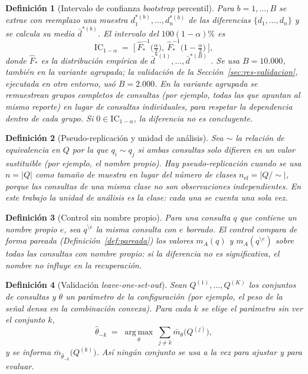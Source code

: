 \documentclass[11pt,letterpaper]{article}
\newtheorem{definition}{Definición}[section]
\numberwithin{equation}{section}
\begin{document}
\begin{definition}[Intervalo de confianza \textit{bootstrap} percentil]
\label{def:bootstrap}
Para $b=1,\dots,B$ se extrae con reemplazo una muestra $d^{*(b)}_1,\dots,d^{*(b)}_n$ de las diferencias $\{d_1,\dots,d_n\}$ y se calcula su media $\bar d^{*(b)}$. El intervalo del $100(1-\alpha)\%$ es
\begin{equation}
\mathrm{IC}_{1-\alpha} \;=\; \Big[\ \hat F^{-1}_{*}\!\big(\tfrac{\alpha}{2}\big),\ \hat F^{-1}_{*}\!\big(1-\tfrac{\alpha}{2}\big)\ \Big],
\label{eq:bootstrap}
\end{equation}
donde $\hat F_{*}$ es la distribución empírica de $\bar d^{*(1)},\dots,\bar d^{*(B)}$ \cite{efron1979bootstrap}. Se usa $B=10.000$, también en la variante agrupada; la validación de la Sección~\ref{sec:res-validacion}, ejecutada en otro entorno, usó $B=2.000$. En la variante \emph{agrupada} se remuestrean grupos completos de consultas (por ejemplo, todas las que apuntan al mismo reporte) en lugar de consultas individuales, para respetar la dependencia dentro de cada grupo. Si $0\in\mathrm{IC}_{1-\alpha}$, la diferencia no es concluyente.
\end{definition}

\begin{definition}[Pseudo-replicación y unidad de análisis]
\label{def:pseudo}
Sea $\sim$ la relación de equivalencia en $Q$ por la que $q_i\sim q_j$ si ambas consultas solo difieren en un valor sustituible (por ejemplo, el nombre propio). Hay pseudo-replicación cuando se usa $n=|Q|$ como tamaño de muestra en lugar del número de clases $n_{\text{ef}}=|Q/\!\sim|$, porque las consultas de una misma clase no son observaciones independientes. En este trabajo la unidad de análisis es la clase: cada una se cuenta una sola vez.
\end{definition}

\begin{definition}[Control sin nombre propio]
\label{def:control-nombre}
Para una consulta $q$ que contiene un nombre propio $e$, sea $q^{\setminus e}$ la misma consulta con $e$ borrado. El control compara de forma pareada (Definición~\ref{def:pareada}) los valores $m_A(q)$ y $m_A(q^{\setminus e})$ sobre todas las consultas con nombre propio: si la diferencia no es significativa, el nombre no influye en la recuperación.
\end{definition}

\begin{definition}[Validación \textit{leave-one-set-out}]
\label{def:loso}
Sean $Q^{(1)},\dots,Q^{(K)}$ los conjuntos de consultas y $\theta$ un parámetro de la configuración (por ejemplo, el peso de la señal densa en la combinación convexa). Para cada $k$ se elige el parámetro sin ver el conjunto $k$,
\begin{equation}
\hat\theta_{-k} \;=\; \operatorname*{arg\,max}_{\theta}\ \sum_{j\neq k}\bar m_{\theta}\big(Q^{(j)}\big),
\label{eq:loso}
\end{equation}
y se informa $\bar m_{\hat\theta_{-k}}\big(Q^{(k)}\big)$. Así ningún conjunto se usa a la vez para ajustar y para evaluar.
\end{definition}
\end{document}
